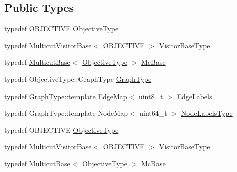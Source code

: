 \subsection*{Public Types}
\begin{DoxyCompactItemize}
\item 
typedef O\+B\+J\+E\+C\+T\+I\+VE \hyperlink{classnifty_1_1graph_1_1opt_1_1multicut_1_1PyMulticutBase_a434bee3be13abad62cacc5fbc4549cde}{Objective\+Type}
\item 
typedef \hyperlink{namespacenifty_1_1graph_1_1opt_1_1multicut_a3a8f68d7814a77531781fb55327f05d2}{Multicut\+Visitor\+Base}$<$ O\+B\+J\+E\+C\+T\+I\+VE $>$ \hyperlink{classnifty_1_1graph_1_1opt_1_1multicut_1_1PyMulticutBase_ac1d714affe7c2138ec75b9faad3000f6}{Visitor\+Base\+Type}
\item 
typedef \hyperlink{classnifty_1_1graph_1_1opt_1_1multicut_1_1MulticutBase}{Multicut\+Base}$<$ \hyperlink{classnifty_1_1graph_1_1opt_1_1multicut_1_1PyMulticutBase_a434bee3be13abad62cacc5fbc4549cde}{Objective\+Type} $>$ \hyperlink{classnifty_1_1graph_1_1opt_1_1multicut_1_1PyMulticutBase_ad3a32e425effa08c6fdf076afaebeec0}{Mc\+Base}
\item 
typedef Objective\+Type\+::\+Graph\+Type \hyperlink{classnifty_1_1graph_1_1opt_1_1multicut_1_1PyMulticutBase_ad6ea80fce39a1ae65b932a9ad293ec83}{Graph\+Type}
\item 
typedef Graph\+Type\+::template Edge\+Map$<$ uint8\+\_\+t $>$ \hyperlink{classnifty_1_1graph_1_1opt_1_1multicut_1_1PyMulticutBase_a326edf5f82eb28bfb7ce464b4056e9e8}{Edge\+Labels}
\item 
typedef Graph\+Type\+::template Node\+Map$<$ uint64\+\_\+t $>$ \hyperlink{classnifty_1_1graph_1_1opt_1_1multicut_1_1PyMulticutBase_a34b9d7a58d056154c6b1abe7a83297c6}{Node\+Labels\+Type}
\item 
typedef O\+B\+J\+E\+C\+T\+I\+VE \hyperlink{classnifty_1_1graph_1_1opt_1_1multicut_1_1PyMulticutBase_a434bee3be13abad62cacc5fbc4549cde}{Objective\+Type}
\item 
typedef \hyperlink{namespacenifty_1_1graph_1_1opt_1_1multicut_a3a8f68d7814a77531781fb55327f05d2}{Multicut\+Visitor\+Base}$<$ O\+B\+J\+E\+C\+T\+I\+VE $>$ \hyperlink{classnifty_1_1graph_1_1opt_1_1multicut_1_1PyMulticutBase_ac1d714affe7c2138ec75b9faad3000f6}{Visitor\+Base\+Type}
\item 
typedef \hyperlink{classnifty_1_1graph_1_1opt_1_1multicut_1_1MulticutBase}{Multicut\+Base}$<$ \hyperlink{classnifty_1_1graph_1_1opt_1_1multicut_1_1PyMulticutBase_a434bee3be13abad62cacc5fbc4549cde}{Objective\+Type} $>$ \hyperlink{classnifty_1_1graph_1_1opt_1_1multicut_1_1PyMulticutBase_ad3a32e425effa08c6fdf076afaebeec0}{Mc\+Base}

\end{DoxyCompactItemize}
